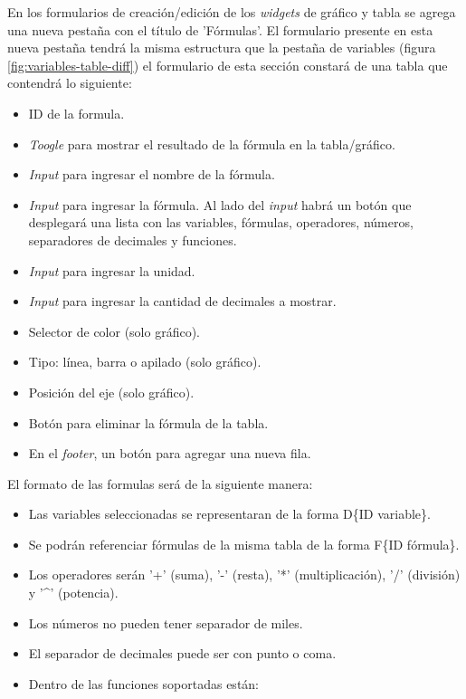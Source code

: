 En los formularios de creación/edición de los \textit{widgets} de gráfico y tabla se agrega una nueva pestaña con el título de 'Fórmulas'. El formulario presente en esta nueva pestaña tendrá la misma estructura que la pestaña de variables (figura \ref{fig:variables-table-diff}) el formulario de esta sección constará de una tabla que contendrá lo siguiente:
\begin{itemize}
    \item ID de la formula.
    \item \textit{Toogle} para mostrar el resultado de la fórmula en la tabla/gráfico.
    \item \textit{Input} para ingresar el nombre de la fórmula.
    \item \textit{Input} para ingresar la fórmula. Al lado del \textit{input} habrá un botón que desplegará una lista con las variables, fórmulas, operadores, números, separadores de decimales y funciones.
    \item \textit{Input} para ingresar la unidad.
    \item \textit{Input} para ingresar la cantidad de decimales a mostrar.
    \item Selector de color (solo gráfico).
    \item Tipo: línea, barra o apilado (solo gráfico).
    \item Posición del eje (solo gráfico).
    \item Botón para eliminar la fórmula de la tabla.
    \item En el \textit{footer}, un botón para agregar una nueva fila.
\end{itemize}

El formato de las formulas será de la siguiente manera:
\begin{itemize}
    \item Las variables seleccionadas se representaran de la forma D\{ID variable\}.
    \item Se podrán referenciar fórmulas de la misma tabla de la forma F\{ID fórmula\}.
    \item Los operadores serán '+' (suma), '-' (resta), '*' (multiplicación), '/' (división) y '\^{}' (potencia).
    \item Los números no pueden tener separador de miles.
    \item El separador de decimales puede ser con punto o coma.
    \item Dentro de las funciones soportadas están:
\end{itemize}

